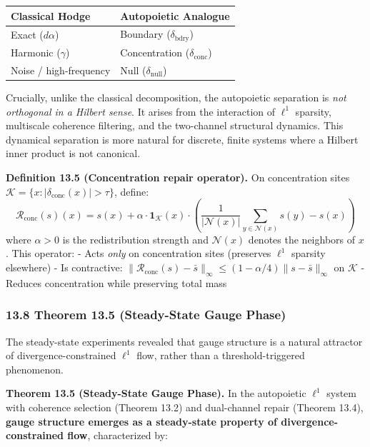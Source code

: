 \documentclass[
]{article}
\begin{document}
\begin{longtable}[]{@{}ll@{}}
\toprule\noalign{}
Classical Hodge & Autopoietic Analogue \\
\midrule\noalign{}
\endhead
\bottomrule\noalign{}
\endlastfoot
Exact (\(d\alpha\)) & Boundary (\(\delta_{\mathrm{bdry}}\)) \\
Harmonic (\(\gamma\)) & Concentration (\(\delta_{\mathrm{conc}}\)) \\
Noise / high-frequency & Null (\(\delta_{\mathrm{null}}\)) \\
\end{longtable}

Crucially, unlike the classical decomposition, the autopoietic
separation is \emph{not orthogonal in a Hilbert sense}. It arises from
the interaction of \(\ell^1\) sparsity, multiscale coherence filtering,
and the two-channel structural dynamics. This dynamical separation is
more natural for discrete, finite systems where a Hilbert inner product
is not canonical.

\textbf{Definition 13.5 (Concentration repair operator).} On
concentration sites
\(\mathcal{K} = \{x : |\delta_{\mathrm{conc}}(x)| > \tau\}\), define:
\[\mathcal{R}_{\mathrm{conc}}(s)(x) = s(x) + \alpha \cdot \mathbf{1}_{\mathcal{K}}(x) \cdot \left(\frac{1}{|\mathcal{N}(x)|}\sum_{y \in \mathcal{N}(x)} s(y) - s(x)\right)\]
where \(\alpha > 0\) is the redistribution strength and
\(\mathcal{N}(x)\) denotes the neighbors of \(x\). This operator: - Acts
\emph{only} on concentration sites (preserves \(\ell^1\) sparsity
elsewhere) - Is contractive:
\(\|\mathcal{R}_{\mathrm{conc}}(s) - \bar{s}\|_\infty \leq (1 - \alpha/4) \|s - \bar{s}\|_\infty\)
on \(\mathcal{K}\) - Reduces concentration while preserving total mass

\subsubsection{13.8 Theorem 13.5 (Steady-State Gauge
Phase)}\label{theorem-13.5-steady-state-gauge-phase}

The steady-state experiments revealed that gauge structure is a natural
attractor of divergence-constrained \(\ell^1\) flow, rather than a
threshold-triggered phenomenon.

\textbf{Theorem 13.5 (Steady-State Gauge Phase).} In the autopoietic
\(\ell^1\) system with coherence selection (Theorem 13.2) and
dual-channel repair (Theorem 13.4), \textbf{gauge structure emerges as a
steady-state property of divergence-constrained flow}, characterized by:
\end{document}
